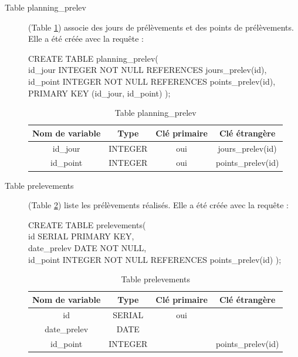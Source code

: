 \documentclass[12pt,a4paper,oneside]{article}
\begin{document}
\begin{description}
\item[Table planning\_prelev] (Table \ref{planning}) associe des jours de prélèvements et des points de prélèvements. Elle a été créée avec la requête :
\begin{tabbing}
CREATE TABLE planning\_prelev(\\
id\_jour INTEGER NOT NULL REFERENCES jours\_prelev(id),\\
id\_point INTEGER NOT NULL REFERENCES points\_prelev(id),\\
PRIMARY KEY (id\_jour, id\_point)
);
\end{tabbing}
\begin{table}
\caption{Table planning\_prelev \label{planning}}
\begin{center}
\begin{tabular}{|c|c|c|c|}
	\hline
	\textbf{Nom de variable} & \textbf{Type} & \textbf{Clé primaire} & \textbf{Clé étrangère}\\
	\hline
	id\_jour & INTEGER & oui & jours\_prelev(id)\\
	id\_point & INTEGER & oui & points\_prelev(id)\\
	\hline
\end{tabular}
\end{center}
\end{table}

\item[Table prelevements] (Table \ref{prelevements}) liste les prélèvements réalisés. Elle a été créée avec la requête :
\begin{tabbing}
CREATE TABLE prelevements(\\
id SERIAL PRIMARY KEY,\\
date\_prelev DATE NOT NULL,\\
id\_point INTEGER NOT NULL REFERENCES points\_prelev(id)
);
\end{tabbing}
\begin{table}
\caption{Table prelevements \label{prelevements}}
\begin{center}
\begin{tabular}{|c|c|c|c|}
	\hline
	\textbf{Nom de variable} & \textbf{Type} & \textbf{Clé primaire} & \textbf{Clé étrangère}\\
	\hline
	id & SERIAL & oui & \\
	date\_prelev & DATE & &\\
	id\_point & INTEGER & & points\_prelev(id)\\
	\hline
\end{tabular}
\end{center}
\end{table}


\end{description}
\end{document}
